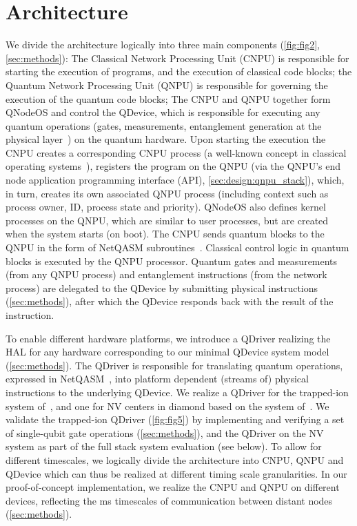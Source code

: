 \section{Architecture}
\label{sec:architecture}
We divide the architecture logically into three main components (\cref{fig:fig2}, \cref{sec:methods}): The Classical Network Processing Unit (CNPU) is responsible for starting the execution of programs, and the execution of classical code blocks; the Quantum Network Processing Unit (QNPU) is responsible for governing the execution of the quantum code blocks; The CNPU and QNPU together form QNodeOS and control the QDevice, which is responsible for executing any quantum operations (gates, measurements, entanglement generation at the physical layer~\cite{dahlberg_2019_egp}) on the quantum hardware. Upon starting the execution the CNPU creates a corresponding CNPU process (a well-known concept in classical operating systems~\cite{dennis_programming_1966-1,tanenbaum_operating_2005}), registers the program on the QNPU (via the QNPU's end node application programming interface (API), \cref{sec:design:qnpu_stack}), which, in turn, creates its own associated QNPU process (including context such as process owner, ID, process state and priority). QNodeOS also defines kernel processes on the QNPU, which are similar to user processes, but are created when the system starts (on boot). The CNPU sends quantum blocks to the QNPU in the form of NetQASM subroutines~\cite{dahlberg_2022_netqasm}. Classical control logic in quantum blocks is executed by the QNPU processor. Quantum gates and measurements (from any QNPU process) and entanglement instructions (from the network process) are delegated to the QDevice by submitting physical instructions (\cref{sec:methods}), after which the QDevice responds back with the result of the instruction. 

To enable different hardware platforms, we introduce a QDriver realizing the HAL for any hardware corresponding to our minimal QDevice system model (\cref{sec:methods}). The QDriver is responsible for translating quantum operations, expressed in NetQASM~\cite{dahlberg_2022_netqasm}, into platform dependent (streams of) physical instructions to the underlying QDevice. We realize a QDriver for the trapped-ion system of~\cite{teller2023integrating,teller2021heating}, and one for NV centers in diamond based on the system of~\cite{hermans2022qubit,pompili_2021_multinode,pompili_2022_experimental}. We validate the trapped-ion QDriver (\cref{fig:fig5}) by implementing and verifying a set of single-qubit gate operations (\cref{sec:methods}), and the QDriver on the NV system as part of the full stack system evaluation (see below). 
To allow for different timescales, we logically divide the architecture into CNPU, QNPU and QDevice which can thus be realized at different timing scale granularities. In our proof-of-concept implementation, we realize the CNPU and QNPU on different devices, reflecting the ms timescales of communication between distant nodes (\cref{sec:methods}).

